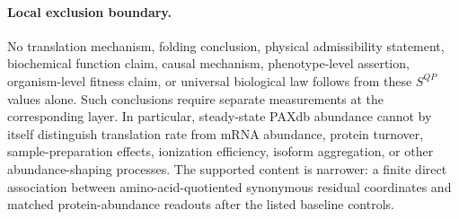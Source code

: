 \paragraph{Local exclusion boundary.}
No translation mechanism, folding conclusion, physical admissibility statement, biochemical function claim, causal mechanism, phenotype-level assertion, organism-level fitness claim, or universal biological law follows from these $S^{QP}$ values alone.  Such conclusions require separate measurements at the corresponding layer.  In particular, steady-state PAXdb abundance cannot by itself distinguish translation rate from mRNA abundance, protein turnover, sample-preparation effects, ionization efficiency, isoform aggregation, or other abundance-shaping processes.  The supported content is narrower: a finite direct association between amino-acid-quotiented synonymous residual coordinates and matched protein-abundance readouts after the listed baseline controls.
